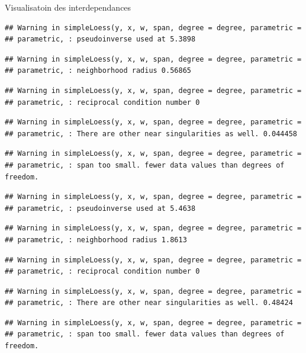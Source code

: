 \documentclass[11pt,ignorenonframetext,]{beamer}
\begin{document}
\begin{frame}[fragile]{Visualisatoin des interdependances}
\begin{verbatim}
## Warning in simpleLoess(y, x, w, span, degree = degree, parametric =
## parametric, : pseudoinverse used at 5.3898
\end{verbatim}

\begin{verbatim}
## Warning in simpleLoess(y, x, w, span, degree = degree, parametric =
## parametric, : neighborhood radius 0.56865
\end{verbatim}

\begin{verbatim}
## Warning in simpleLoess(y, x, w, span, degree = degree, parametric =
## parametric, : reciprocal condition number 0
\end{verbatim}

\begin{verbatim}
## Warning in simpleLoess(y, x, w, span, degree = degree, parametric =
## parametric, : There are other near singularities as well. 0.044458
\end{verbatim}

\begin{verbatim}
## Warning in simpleLoess(y, x, w, span, degree = degree, parametric =
## parametric, : span too small. fewer data values than degrees of freedom.
\end{verbatim}

\begin{verbatim}
## Warning in simpleLoess(y, x, w, span, degree = degree, parametric =
## parametric, : pseudoinverse used at 5.4638
\end{verbatim}

\begin{verbatim}
## Warning in simpleLoess(y, x, w, span, degree = degree, parametric =
## parametric, : neighborhood radius 1.8613
\end{verbatim}

\begin{verbatim}
## Warning in simpleLoess(y, x, w, span, degree = degree, parametric =
## parametric, : reciprocal condition number 0
\end{verbatim}

\begin{verbatim}
## Warning in simpleLoess(y, x, w, span, degree = degree, parametric =
## parametric, : There are other near singularities as well. 0.48424
\end{verbatim}

\begin{verbatim}
## Warning in simpleLoess(y, x, w, span, degree = degree, parametric =
## parametric, : span too small. fewer data values than degrees of freedom.
\end{verbatim}


\end{frame}
\end{document}
